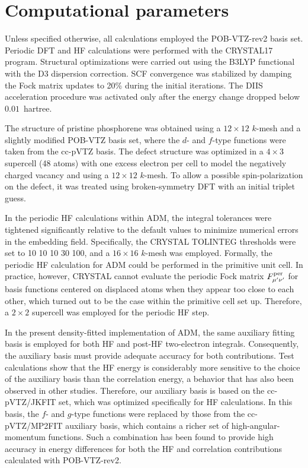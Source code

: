 \documentclass[aip,jcp,reprint]{revtex4-2}
\begin{document}
\section{Computational parameters}


Unless specified otherwise, all calculations employed the POB-VTZ-rev2 basis set.\cite{POB_VTZ-rev2} Periodic DFT and HF calculations were performed with the \textsc{CRYSTAL17} program.\cite{CRYSTAL} Structural optimizations were carried out using the B3LYP functional\cite{B3LYP1} with the D3 dispersion correction.\cite{GrimmeD3}
SCF convergence was stabilized by damping the Fock matrix updates to 20\% during the initial iterations. The DIIS acceleration procedure was activated only after the energy change dropped below $0.01$~hartree.

The structure of pristine phosphorene was obtained using a $12\times12$ $k$-mesh and a slightly modified POB-VTZ basis set, where the $d$- and $f$-type functions were taken from the cc-pVTZ basis.\cite{Dunning1989}
The defect structure was optimized in a $4\times3$ supercell (48 atoms) with one excess electron per cell to model the negatively charged vacancy and using a $12\times12$ $k$-mesh. To allow a possible spin-polarization on the defect, it was  treated using broken-symmetry DFT with an initial triplet guess.


In the periodic HF calculations within ADM, the integral tolerances were tightened significantly relative to the default values to minimize numerical errors in the embedding field. Specifically, the  \textsc{CRYSTAL} TOLINTEG thresholds were set to 10 10 10 30 100, and a $16\times16$ $k$-mesh was employed. Formally, the periodic HF calculation for ADM could be performed in the primitive unit cell. In practice, however, \textsc{CRYSTAL} cannot evaluate the periodic Fock matrix $F^{\rm per}_{\mu'\nu'}$ for basis functions centered on displaced atoms when they appear too close to each other, which turned out to be the case within the primitive cell set up. Therefore, a $2\times2$ supercell was employed for the periodic HF step.

In the present density-fitted implementation of ADM, the same auxiliary fitting basis is employed for both HF and post-HF two-electron integrals. Consequently, the auxiliary basis must provide adequate accuracy for both contributions. Test calculations show that the HF energy is considerably more sensitive to the choice of the auxiliary basis than the correlation energy, a behavior that has also been observed in other studies.\cite{DF_HF_sensitive}
Therefore, our auxiliary basis is based on the cc-pVTZ/JKFIT set,\cite{Weigend2002_JKFIT} which was optimized specifically for HF calculations. In this basis, the $f$- and $g$-type functions were replaced by those from the cc-pVTZ/MP2FIT auxiliary basis,\cite{Weigend2002_MP2FIT} which contains a richer set of high-angular-momentum functions. Such a combination has been found to provide high accuracy in energy differences for both the HF and correlation contributions calculated with POB-VTZ-rev2.
\end{document}
